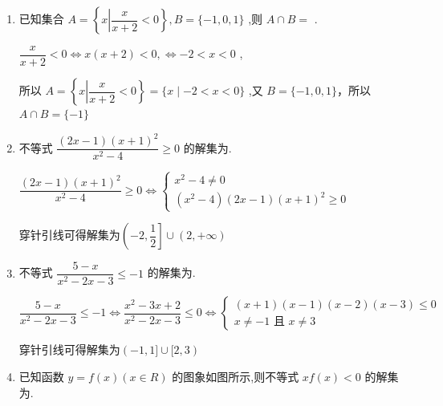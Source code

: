 \begin{enumerate}
    \item 已知集合 $A = \left\{  {x\left| {\dfrac{x}{x + 2} < 0}\right. }\right\}  ,B = \{  - 1,0,1\}$ ,则 $A \cap  B =$ .
    \begin{jieda}
        $\dfrac{x}{x + 2} < 0 \Longleftrightarrow  x\left( {x + 2}\right)  < 0, \Longleftrightarrow - 2 < x < 0$ ,
        
        所以 $A = \left\{  {x\left| {\dfrac{x}{x + 2} < 0}\right. }\right\}   = \{ x \mid   - 2 < x < 0\}$ ,又 $B = \{  - 1,0,1\}$，所以 $A \cap  B = \{  - 1\}$
    \end{jieda}
    
    \item 不等式 $\dfrac{\left( {{2x} - 1}\right) {\left( x + 1\right) }^{2}}{{x}^{2} - 4} \geq  0$ 的解集为.
    \begin{jieda}
        $\dfrac{\left( {{2x} - 1}\right) {\left( x + 1\right) }^{2}}{{x}^{2} - 4} \geq  0 \Longleftrightarrow \left\{\begin{array}{l}
             {x}^{2} - 4 \neq  0  \\
             \left( {{x}^{2} - 4}\right) \left( {{2x} - 1}\right) {\left( x + 1\right) }^{2} \geq  0 
        \end{array}\right.$

        穿针引线可得解集为$\left( {-2,\dfrac{1}{2}}\right\rbrack   \cup  \left( {2, + \infty }\right)$
    \end{jieda}
    \item 不等式 $\dfrac{5 - x}{{x}^{2} - {2x} - 3} \leq   - 1$ 的解集为.
    \begin{jieda}
        $\dfrac{5 - x}{{x}^{2} - {2x} - 3} \leq   - 1 \Longleftrightarrow \dfrac{{x}^{2} - {3x} + 2}{{x}^{2} - {2x} - 3} \leq  0 \Longleftrightarrow\left\{  \begin{array}{l} \left( {x + 1}\right) \left( {x - 1}\right) \left( {x - 2}\right) \left( {x - 3}\right)  \leq  0 \\  x \neq   - 1\text{ 且 }x \neq  3 \end{array}\right.$

        穿针引线可得解集为$\left( {-1,1\rbrack \cup \lbrack 2,3}\right)$ 
    \end{jieda} 
    \item 已知函数 $y = f\left( x\right) \left( {x \in  R}\right)$ 的图象如图所示,则不等式 ${xf}\left( x\right)  < 0$ 的解集为.
    

\end{enumerate}
